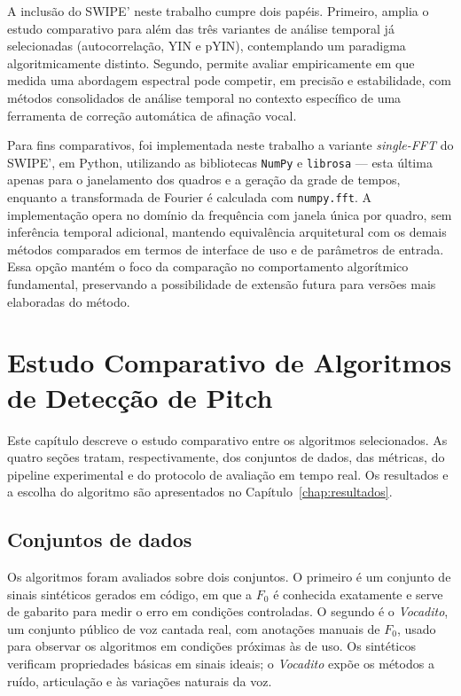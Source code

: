 A inclusão do SWIPE' neste trabalho cumpre dois papéis. Primeiro, amplia o estudo comparativo para além das três variantes de análise temporal já selecionadas (autocorrelação, YIN e pYIN), contemplando um paradigma algoritmicamente distinto. Segundo, permite avaliar empiricamente em que medida uma abordagem espectral pode competir, em precisão e estabilidade, com métodos consolidados de análise temporal no contexto específico de uma ferramenta de correção automática de afinação vocal.

Para fins comparativos, foi implementada neste trabalho a variante \textit{single-FFT} do SWIPE', em Python, utilizando as bibliotecas \texttt{NumPy} e \texttt{librosa} --- esta última apenas para o janelamento dos quadros e a geração da grade de tempos, enquanto a transformada de Fourier é calculada com \texttt{numpy.fft}. A implementação opera no domínio da frequência com janela única por quadro, sem inferência temporal adicional, mantendo equivalência arquitetural com os demais métodos comparados em termos de interface de uso e de parâmetros de entrada. Essa opção mantém o foco da comparação no comportamento algorítmico fundamental, preservando a possibilidade de extensão futura para versões mais elaboradas do método.

\chapter{\label{chap:estudo_comparativo}Estudo Comparativo de Algoritmos de Detecção de Pitch}

Este capítulo descreve o estudo comparativo entre os algoritmos selecionados. As quatro seções tratam, respectivamente, dos conjuntos de dados, das métricas, do pipeline experimental e do protocolo de avaliação em tempo real. Os resultados e a escolha do algoritmo são apresentados no Capítulo~\ref{chap:resultados}.

\section{Conjuntos de dados}

Os algoritmos foram avaliados sobre dois conjuntos. O primeiro é um conjunto de sinais sintéticos gerados em código, em que a $F_0$ é conhecida exatamente e serve de gabarito para medir o erro em condições controladas. O segundo é o \textit{Vocadito}, um conjunto público de voz cantada real, com anotações manuais de $F_0$, usado para observar os algoritmos em condições próximas às de uso. Os sintéticos verificam propriedades básicas em sinais ideais; o \textit{Vocadito} expõe os métodos a ruído, articulação e às variações naturais da voz.

